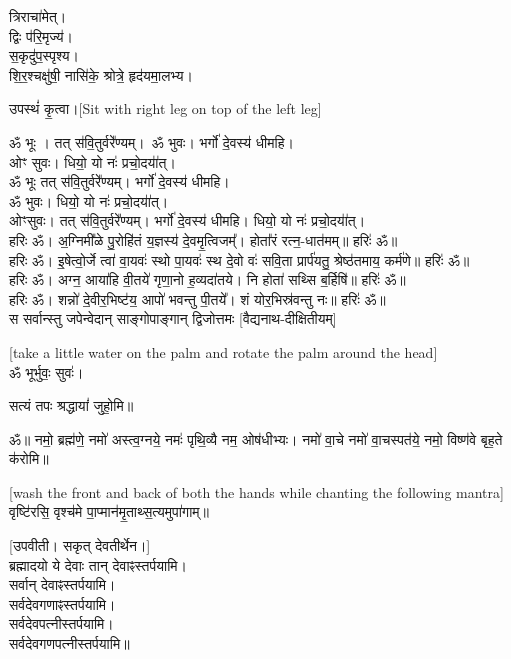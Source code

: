 त्रिराचा॑मेत्।\\
द्विः प॑रि॒मृज्य॑।\\
स॒कृदु॑प॒स्पृश्य।\\
शि॒र॒श्चक्षु॑षी॒ नासि॑के॒ श्रोत्रे॒ हृद॑यमा॒लभ्य।

उपस्थं॑ कृ॒त्वा।{\scriptsize [Sit with right leg on top of the left leg]}

ॐ भूः । तत् स॑वि॒तुर्वरे॑॑ण्यम्।\
ॐ भुवः। भर्गो॑ दे॒वस्य॑ धीमहि।\\
ओꣳ सुवः। धियो॒ यो नः॑ प्रचो॒दया॑॑त्।\\
ॐ भूः तत् स॑वि॒तुर्वरे॑॑ण्यम्। भर्गो॑ दे॒वस्य॑ धीमहि।\\
ॐ भुवः। धियो॒ यो नः॑ प्रचो॒दया॑॑त्।\\
ओꣳसुवः। तत् स॑वि॒तुर्वरे॑॑ण्यम्। भर्गो॑ दे॒वस्य॑ धीमहि। धियो॒ यो नः॑ प्रचो॒दया॑॑त्।\\

हरिः ॐ। अ॒ग्निमी᳚ळे पु॒रोहि॑तं य॒ज्ञस्य॑ दे॒वमृ॒त्विजम्᳚। होता᳚रं रत्न॒-धात॑मम्॥ हरिः॑ ॐ॥\\

हरिः ॐ। इ॒षेत्वो॒र्जे त्वा॑ वा॒यवः॑ स्थो पा॒यवः॑ स्थ दे॒वो वः॑ सवि॒ता प्रार्प॑यतु॒ श्रेष्ठ॑तमाय॒ कर्म॑णे॥ हरिः॑ ॐ॥ \\

हरिः ॐ। अग्न॒ आया॑हि वी॒तये॑ गृणा॒नो ह॒व्यदा॑तये। नि होता॑ सथ्सि ब॒र्हिषि॑॥ हरिः॑ ॐ॥\\

हरिः ॐ। शन्नो॑ दे॒वीर॒भिष्ट॑य॒ आपो॑ भवन्तु पी॒तये᳚। शं योर॒भिस्र॑वन्तु नः॥ हरिः॑ ॐ॥\\

{\centering
{}
{स सर्वान्स्तु जपेन्वेदान् साङ्गोपाङ्गान् द्विजोत्तमः}
}
{\hfill [वैद्यनाथ-दीक्षितीयम्]}

{\scriptsize [take a little water on the palm and rotate the palm around the head]}\\
ॐ भूर्भुवः॒ सुवः॑।

सत्यं तपः श्रद्धायां॑ जुहो॒मि॥


ॐ॥ नमो॒ ब्रह्म॑णे॒ नमो॑ अस्त्व॒ग्नये॒ नमः॑ पृथि॒व्यै नम॒ ओष॑धीभ्यः।
नमो॑ वा॒चे नमो॑ वा॒चस्पत॑ये॒ नमो॒ विष्ण॑वे बृह॒ते क॑रोमि॥

{\scriptsize [wash the front and back of both the hands while chanting the following mantra]}\\
वृष्टि॑रसि॒ वृश्च॑मे पा॒प्मान॑मृ॒ताथ्स॒त्यमुपा॑गाम्॥

\vspace{-1ex}
{\scriptsize [उपवीती। सकृत् देवतीर्थेन।]}\\
ब्रह्मादयो ये देवाः तान् देवाꣴस्तर्पयामि।\\
सर्वान् देवाꣴस्तर्पयामि।\\
सर्वदेवगणाꣴस्तर्पयामि।\\
सर्वदेवपत्नीस्तर्पयामि।\\
सर्वदेवगणपत्नीस्तर्पयामि॥

